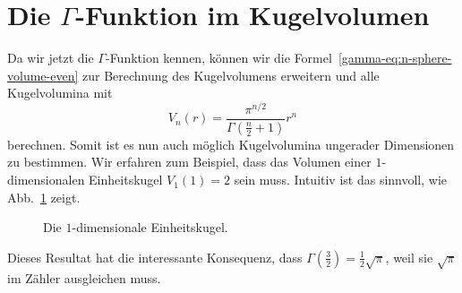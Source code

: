 \section{Die $\Gamma$-Funktion im Kugelvolumen\label{gamma:section:teil0}}
Da wir jetzt die $\Gamma$-Funktion kennen, können wir die Formel~\eqref{gamma-eq:n-sphere-volume-even} 
zur Berechnung des Kugelvolumens erweitern und alle Kugelvolumina mit
\begin{equation}
\label{gamma-eq:n-sphere-volume}
    V_n(r) = \frac{\pi^{n/2}}{\Gamma(\frac{n}{2}+1)}  r^n
\end{equation}
berechnen. 
Somit ist es nun auch möglich Kugelvolumina ungerader Dimensionen zu bestimmen.
Wir erfahren zum Beispiel, dass das Volumen einer $1$-dimensionalen Einheitskugel $V_1(1) = 2$ sein muss. 
Intuitiv ist das sinnvoll, wie Abb.~\ref{gamma-fig:1-dim-sphere} zeigt.

\begin{figure}
    \centering
    \caption{Die $1$-dimensionale Einheitskugel.}
    \label{gamma-fig:1-dim-sphere}
\end{figure}

Dieses Resultat hat die interessante Konsequenz, dass $\Gamma(\frac{3}{2}) = \frac{1}{2} \sqrt{\pi}$, weil sie $\sqrt{\pi}$ im Zähler ausgleichen muss.
